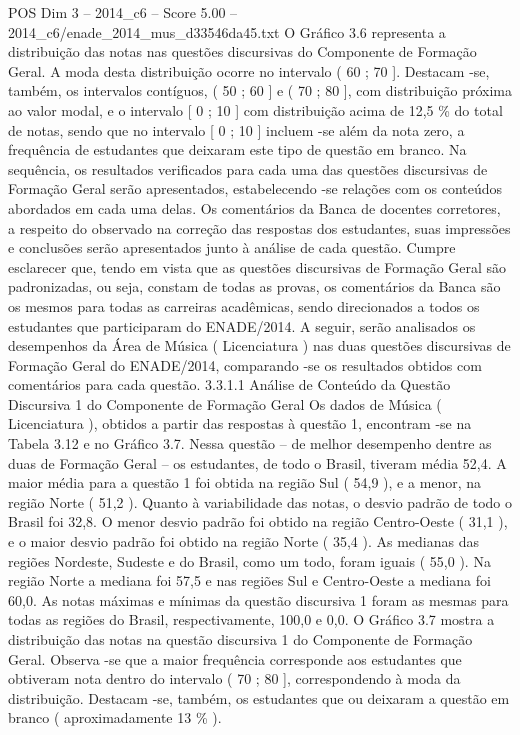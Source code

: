 \begin{textsample}{POS Dim 3 – 2014\_c6 – Score 5.00 – 2014\_c6/enade\_2014\_mus\_d33546da45.txt}
O Gráfico 3.6 representa a distribuição das notas nas questões discursivas do Componente de Formação Geral.
A moda desta distribuição ocorre no intervalo ( 60 ; 70 ].
Destacam -se, também, os intervalos contíguos, ( 50 ; 60 ] e ( 70 ; 80 ], com distribuição próxima ao valor modal, e o intervalo [ 0 ; 10 ] com distribuição acima de 12,5 \% do total de notas, sendo que no intervalo [ 0 ; 10 ] incluem -se além da nota zero, a frequência de estudantes que deixaram este tipo de questão em branco.
Na sequência, os resultados verificados para cada uma das questões discursivas de Formação Geral serão apresentados, estabelecendo -se relações com os conteúdos abordados em cada uma delas.
Os comentários da Banca de docentes corretores, a respeito do observado na correção das respostas dos estudantes, suas impressões e conclusões serão apresentados junto à análise de cada questão.
Cumpre esclarecer que, tendo em vista que as questões discursivas de Formação Geral são padronizadas, ou seja, constam de todas as provas, os comentários da Banca são os mesmos para todas as carreiras acadêmicas, sendo direcionados a todos os estudantes que participaram do ENADE/2014.
A seguir, serão analisados os desempenhos da Área de Música ( Licenciatura ) nas duas questões discursivas de Formação Geral do ENADE/2014, comparando -se os resultados obtidos com comentários para cada questão. 3.3.1.1 Análise de Conteúdo da Questão Discursiva 1 do Componente de Formação Geral Os dados de Música ( Licenciatura ), obtidos a partir das respostas à questão 1, encontram -se na Tabela 3.12 e no Gráfico 3.7.
Nessa questão – de melhor desempenho dentre as duas de Formação Geral – os estudantes, de todo o Brasil, tiveram média 52,4.
A maior média para a questão 1 foi obtida na região Sul ( 54,9 ), e a menor, na região Norte ( 51,2 ).
Quanto à variabilidade das notas, o desvio padrão de todo o Brasil foi 32,8.
O menor desvio padrão foi obtido na região Centro-Oeste ( 31,1 ), e o maior desvio padrão foi obtido na região Norte ( 35,4 ).
As medianas das regiões Nordeste, Sudeste e do Brasil, como um todo, foram iguais ( 55,0 ).
Na região Norte a mediana foi 57,5 e nas regiões Sul e Centro-Oeste a mediana foi 60,0.
As notas máximas e mínimas da questão discursiva 1 foram as mesmas para todas as regiões do Brasil, respectivamente, 100,0 e 0,0.
O Gráfico 3.7 mostra a distribuição das notas na questão discursiva 1 do Componente de Formação Geral.
Observa -se que a maior frequência corresponde aos estudantes que obtiveram nota dentro do intervalo ( 70 ; 80 ], correspondendo à moda da distribuição.
Destacam -se, também, os estudantes que ou deixaram a questão em branco ( aproximadamente 13 \% ).

\end{textsample}
